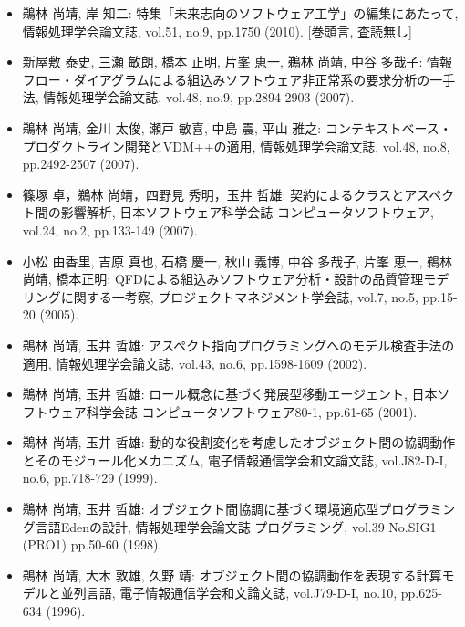 \documentclass{jarticle}
\begin{document}
\begin{itemize}
\item 鵜林 尚靖, 岸 知二:
特集「未来志向のソフトウェア工学」の編集にあたって,
情報処理学会論文誌,
vol.51, no.9, pp.1750 (2010). [巻頭言, 査読無し]

\item 新屋敷 泰史, 三瀬 敏朗, 橋本 正明, 片峯 恵一, 鵜林 尚靖, 中谷 多哉子:
情報フロー・ダイアグラムによる組込みソフトウェア非正常系の要求分析の一手法,
情報処理学会論文誌, vol.48, no.9, pp.2894-2903 (2007).

\item 鵜林 尚靖, 金川 太俊, 瀬戸 敏喜, 中島 震, 平山 雅之:
コンテキストベース・プロダクトライン開発とVDM++の適用,
情報処理学会論文誌,
vol.48, no.8, pp.2492-2507 (2007).

\item 篠塚 卓，鵜林 尚靖，四野見 秀明，玉井 哲雄:
契約によるクラスとアスペクト間の影響解析,
日本ソフトウェア科学会誌 コンピュータソフトウェア,
vol.24, no.2, pp.133-149 (2007).

\item 小松 由香里, 吉原 真也, 石橋 慶一, 秋山 義博, 中谷 多哉子, 片峯 恵一, 鵜林 尚靖, 橋本正明:
QFDによる組込みソフトウェア分析・設計の品質管理モデリングに関する一考察,
プロジェクトマネジメント学会誌,
vol.7, no.5, pp.15-20 (2005).

\item 鵜林 尚靖, 玉井 哲雄:
アスペクト指向プログラミングへのモデル検査手法の適用,
情報処理学会論文誌,
vol.43, no.6, pp.1598-1609 (2002).

\item 鵜林 尚靖, 玉井 哲雄:
ロール概念に基づく発展型移動エージェント,
日本ソフトウェア科学会誌 コンピュータソフトウェア80-1,
pp.61-65 (2001).

\item 鵜林 尚靖, 玉井 哲雄:
動的な役割変化を考慮したオブジェクト間の協調動作とそのモジュール化メカニズム,
電子情報通信学会和文論文誌,
vol.J82-D-I, no.6, pp.718-729 (1999).

\item 鵜林 尚靖, 玉井 哲雄:
オブジェクト間協調に基づく環境適応型プログラミング言語Edenの設計,
情報処理学会論文誌 プログラミング,
vol.39 No.SIG1 (PRO1) pp.50-60 (1998).

\item 鵜林 尚靖, 大木 敦雄, 久野 靖:
オブジェクト間の協調動作を表現する計算モデルと並列言語,
電子情報通信学会和文論文誌,
vol.J79-D-I, no.10, pp.625-634 (1996).
\end{itemize}


\end{document}
